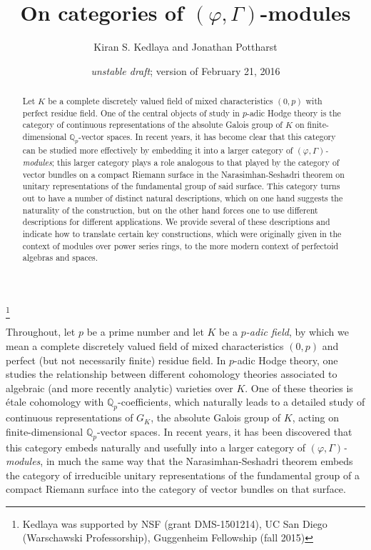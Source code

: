 \documentclass[12pt]{amsart}
\theoremstyle{definition}
\numberwithin{equation}{theorem}
\newcommand{\QQ}{\mathbb{Q}}
\begin{document}
\title{On categories of $(\varphi, \Gamma)$-modules}
\author{Kiran S. Kedlaya and Jonathan Pottharst}
\thanks{Kedlaya was supported by NSF (grant DMS-1501214), UC San Diego (Warschawski Professorship), Guggenheim Fellowship (fall 2015)}
\date{\textit{unstable draft}; version of February 21, 2016}

\begin{abstract}
Let $K$ be a complete discretely valued field of mixed characteristics $(0,p)$ with perfect residue field. One of the central objects of study in $p$-adic Hodge theory is the cate\-gory of continuous representations of the absolute Galois group of $K$ on finite-dimensional $\QQ_p$-vector spaces. In recent years, it has become clear that this category can be studied more effectively by embedding it into a larger category of \emph{$(\varphi, \Gamma)$-modules}; this larger category plays a role analogous to that played by the category of vector bundles on a compact Riemann surface in the Narasimhan-Seshadri theorem on unitary representations of the fundamental group of said surface. This category turns out to have a number of distinct natural descriptions, which on one hand suggests the naturality of the construction, but on the other hand forces one to use different descriptions for different applications. We provide several of these descriptions and indicate how to translate certain key constructions, which were originally given in the context of modules over power series rings, to the more modern context of perfectoid algebras and spaces.
\end{abstract}

\maketitle

Throughout, let $p$ be a prime number and let $K$ be a \emph{$p$-adic field}, by which we mean a complete discretely valued field of mixed characteristics $(0,p)$ and perfect (but not necessarily finite) residue field. In $p$-adic Hodge theory, one studies the relationship between different cohomology theories associated to algebraic (and more recently analytic) varieties over $K$. One of these theories is \'etale cohomology with $\QQ_p$-coefficients, which naturally leads to a detailed study of continuous representations of $G_K$, the absolute Galois group of $K$, acting on finite-dimensional $\QQ_p$-vector spaces. In recent years, it has been discovered that this category embeds naturally and usefully into a larger category of \emph{$(\varphi, \Gamma)$-modules}, in much the same way that the Narasimhan-Seshadri theorem embeds the category of irreducible unitary representations of the fundamental group of a compact Riemann surface into the category of vector bundles on that surface.
\end{document}
